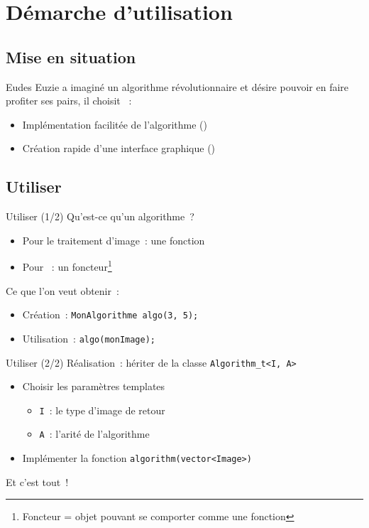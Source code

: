 \section{Démarche d'utilisation}

\subsection{Mise en situation}
\begin{frame}
  Eudes Euzie a imaginé un algorithme révolutionnaire et désire pouvoir en faire
  profiter ses pairs, il choisit ~:

  \begin{itemize}
    \item Implémentation facilitée de l'algorithme ()
    \item Création rapide d'une interface graphique ()
  \end{itemize}
\end{frame}

\subsection{Utiliser }
\begin{frame}{Utiliser  (1/2)}
  Qu'est-ce qu'un algorithme~?

  \begin{itemize}
    \item Pour le traitement d'image~: une fonction
    \item Pour ~: un foncteur\footnote{Foncteur = objet pouvant se
      comporter comme une fonction}
  \end{itemize}

  Ce que l'on veut obtenir~:

  \begin{itemize}
    \item Création~: \texttt{MonAlgorithme algo(3, 5);}
    \item Utilisation~: \texttt{algo(monImage);}
  \end{itemize}
\end{frame}

\begin{frame}{Utiliser  (2/2)}
  Réalisation~: hériter de la classe \texttt{Algorithm\_t<I, A>}

  \begin{itemize}
    \item Choisir les paramètres templates
      \begin{itemize}
        \item \texttt{I}~: le type d'image de retour
        \item \texttt{A}~: l'arité de l'algorithme
      \end{itemize}
    \item Implémenter la fonction \texttt{algorithm(vector<Image>)}
  \end{itemize}

  Et c'est tout~!
\end{frame}

